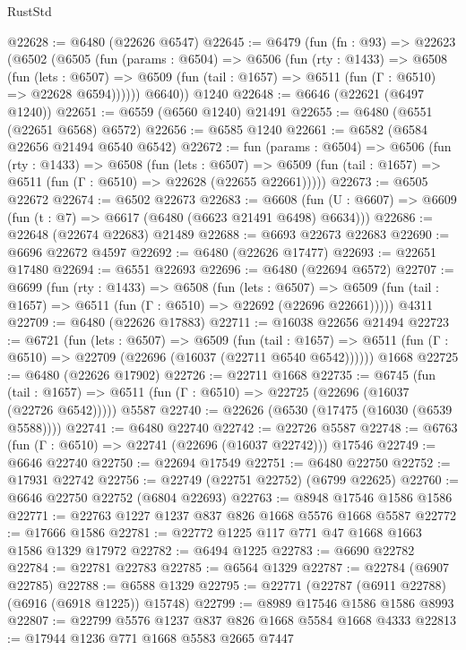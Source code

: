 \begin{lexlean}{RustStd}
\begin{coremodule}
@22628 := @6480 (@22626 @6547)
@22645 := @6479
    (fun (fn : @93) =>
    @22623
      (@6502
        (@6505
          (fun (params : @6504) =>
          @6506
            (fun (rty : @1433) =>
            @6508
              (fun (lets : @6507) =>
              @6509 (fun (tail : @1657) => @6511 (fun (Γ : @6510) => @22628 @6594))))))
        @6640))
    @1240
@22648 := @6646 (@22621 (@6497 @1240))
@22651 := @6559 (@6560 @1240) @21491
@22655 := @6480 (@6551 (@22651 @6568) @6572)
@22656 := @6585 @1240
@22661 := @6582 (@6584 @22656 @21494 @6540 @6542)
@22672 := fun (params : @6504) =>
  @6506
    (fun (rty : @1433) =>
    @6508
      (fun (lets : @6507) =>
      @6509 (fun (tail : @1657) => @6511 (fun (Γ : @6510) => @22628 (@22655 @22661)))))
@22673 := @6505 @22672
@22674 := @6502 @22673
@22683 := @6608
    (fun (U : @6607) => @6609 (fun (t : @7) => @6617 (@6480 (@6623 @21491 @6498) @6634)))
@22686 := @22648 (@22674 @22683) @21489
@22688 := @6693 @22673 @22683
@22690 := @6696 @22672 @4597
@22692 := @6480 (@22626 @17477)
@22693 := @22651 @17480
@22694 := @6551 @22693
@22696 := @6480 (@22694 @6572)
@22707 := @6699
    (fun (rty : @1433) =>
    @6508
      (fun (lets : @6507) =>
      @6509 (fun (tail : @1657) => @6511 (fun (Γ : @6510) => @22692 (@22696 @22661)))))
    @4311
@22709 := @6480 (@22626 @17883)
@22711 := @16038 @22656 @21494
@22723 := @6721
    (fun (lets : @6507) =>
    @6509
      (fun (tail : @1657) =>
      @6511 (fun (Γ : @6510) => @22709 (@22696 (@16037 (@22711 @6540 @6542))))))
    @1668
@22725 := @6480 (@22626 @17902)
@22726 := @22711 @1668
@22735 := @6745
    (fun (tail : @1657) => @6511 (fun (Γ : @6510) => @22725 (@22696 (@16037 (@22726 @6542)))))
    @5587
@22740 := @22626 (@6530 (@17475 (@16030 (@6539 @5588))))
@22741 := @6480 @22740
@22742 := @22726 @5587
@22748 := @6763 (fun (Γ : @6510) => @22741 (@22696 (@16037 @22742))) @17546
@22749 := @6646 @22740
@22750 := @22694 @17549
@22751 := @6480 @22750
@22752 := @17931 @22742
@22756 := @22749 (@22751 @22752) (@6799 @22625)
@22760 := @6646 @22750 @22752 (@6804 @22693)
@22763 := @8948 @17546 @1586 @1586
@22771 := @22763 @1227 @1237 @837 @826 @1668 @5576 @1668 @5587
@22772 := @17666 @1586
@22781 := @22772 @1225 @117 @771 @47 @1668 @1663 @1586 @1329 @17972
@22782 := @6494 @1225
@22783 := @6690 @22782
@22784 := @22781 @22783
@22785 := @6564 @1329
@22787 := @22784 (@6907 @22785)
@22788 := @6588 @1329
@22795 := @22771 (@22787 (@6911 @22788) (@6916 (@6918 @1225)) @15748)
@22799 := @8989 @17546 @1586 @1586 @8993
@22807 := @22799 @5576 @1237 @837 @826 @1668 @5584 @1668 @4333
@22813 := @17944 @1236 @771 @1668 @5583 @2665 @7447

\end{coremodule}
\end{lexlean}
